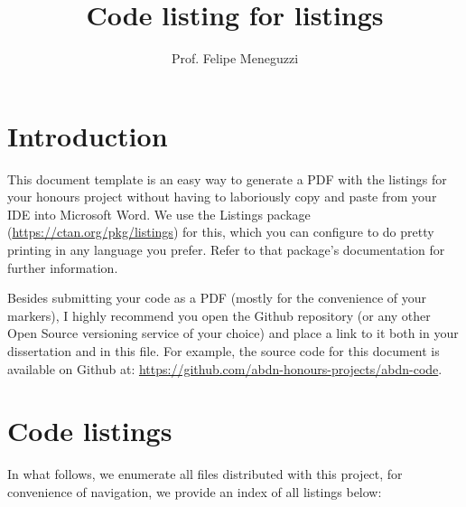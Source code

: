\documentclass[a4paper]{article}
\title{Code listing for listings}
\author{Prof. Felipe Meneguzzi}
\begin{document}
\maketitle

\section*{Introduction}

This document template is an easy way to generate a PDF with the listings for your honours project without having to laboriously copy and paste from your IDE into Microsoft Word. We use the Listings package (\url{https://ctan.org/pkg/listings}) for this, which you can configure to do pretty printing in any language you prefer. Refer to that package's documentation for further information. 

Besides submitting your code as a PDF (mostly for the convenience of your markers), I highly recommend you open the Github repository (or any other Open Source versioning service of your choice) and place a link to it both in your dissertation and in this file. 
For example, the source code for this document is available on Github at: \url{https://github.com/abdn-honours-projects/abdn-code}.

\section*{Code listings}

In what follows, we enumerate all files distributed with this project, for convenience of navigation, we provide an index of all listings below:

\lstlistoflistings


\end{document}
